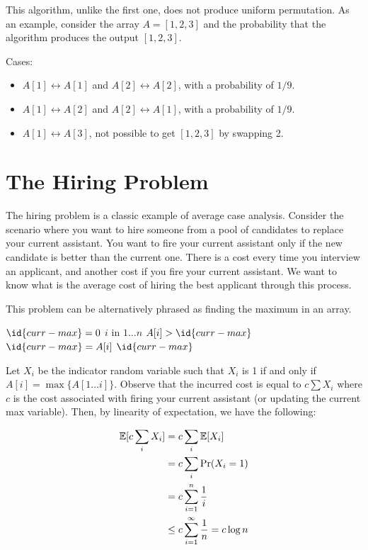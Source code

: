 This algorithm, unlike the first one, does not produce uniform permutation. As an example, consider the array $A = [1,2,3]$ and the probability that the algorithm produces the output $[1,2,3]$.

Cases:
\begin{itemize}
    \item $A[1] \leftrightarrow A[1]$ and $A[2] \leftrightarrow A[2]$, with a probability of $1/9$.
    \item $A[1] \leftrightarrow A[2]$ and $A[2] \leftrightarrow A[1]$, with a probability of $1/9$.
    \item $A[1] \leftrightarrow A[3]$, not possible to get $[1,2,3]$ by swapping 2.
\end{itemize}

\section{The Hiring Problem}

The hiring problem is a classic example of average case analysis. Consider the scenario where you want to hire someone from a pool of candidates to replace your current assistant. You want to fire your current assistant only if the new candidate is better than the current one. There is a cost every time you interview an applicant, and another cost if you fire your current assistant. We want to know what is the average cost of hiring the best applicant through this process.

This problem can be alternatively phrased as finding the maximum in an array.

\begin{codebox}
    \li $\id{curr-max} = 0$
    \li \For $i$ in $1\ldots n$ \Do
        \li \If $A[i] > \id{curr-max}$ \Then
            \li $\id{curr-max} = A[i]$
        \End
    \End
    \li \Return $\id{curr-max}$   
\end{codebox}

Let $X_i$ be the indicator random variable such that $X_i$ is 1 if and only if $A[i] = \max\{A[1\ldots i] \}$. Observe that the incurred cost is equal to $c \sum X_i$ where $c$ is the cost associated with firing your current assistant (or updating the current max variable). Then, by linearity of expectation, we have the following:

$$
\begin{aligned}
    \operatorname*{\mathbb{E}}[c \sum_i {X_i}] &= c \sum_i \operatorname*{\mathbb{E}}[X_i] \\
    &= c \sum_{i} \Pr(X_i = 1) \\
    &= c \sum_{i=1}^n \frac{1}{i} \\
    &\leq c \sum_{i=1}^\infty \frac{1}{n} = c \log n
\end{aligned}
$$

